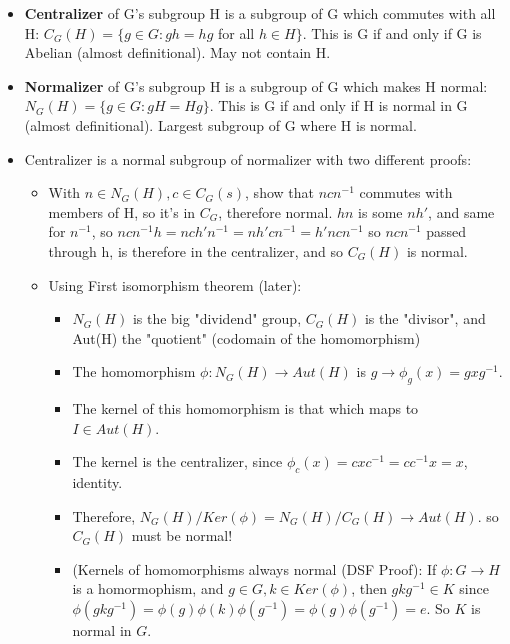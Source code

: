 \documentclass[11pt, oneside]{article}   	%
\begin{document}
\begin{itemize}
\item \textbf{Centralizer} of G's subgroup H is a subgroup of G which commutes with all H: $C_G(H) = \{g \in G: gh = hg$ for all $h \in H\}$.  This is G if and only if G is Abelian (almost definitional).  May not contain H.
\item \textbf{Normalizer} of G's subgroup H is a subgroup of G which makes H normal: $N_G(H) = \{g \in G: gH= Hg\}$.  This is G if and only if H is normal in G (almost definitional).  Largest subgroup of G where H is normal.
\item Centralizer is  a normal subgroup of normalizer with two different proofs:
\begin{itemize}
\item With $n \in N_G(H), c \in C_G(s)$, show that $ncn^{-1}$ commutes with members of H, so it's in $C_G$, therefore normal.  $hn$ is some $nh'$, and same for $n^{-1}$, so $ncn^{-1}h = nch'n^{-1} = nh'cn^{-1} = h'ncn^{-1}$ so $ncn^{-1}$ passed through h, is therefore in the centralizer, and so $C_G(H)$ is normal.
\item Using First isomorphism theorem (later): 
  \begin{itemize}
  \item $N_G(H)$ is the big "dividend" group, $C_G(H)$ is the "divisor", and Aut(H) the "quotient" (codomain of the homomorphism)
  \item The homomorphism $\phi: N_G(H) \rightarrow Aut(H)$ is $g \rightarrow \phi_g(x) = gxg^{-1}$.
  \item The kernel of this homomorphism is that which maps to $I \in Aut(H)$.
  \item The kernel is the centralizer, since $\phi_c(x) = cxc^{-1} = cc^{-1}x = x$, identity.
  \item Therefore, $N_G(H) / Ker(\phi) = N_G(H) / C_G(H) \rightarrow Aut(H).$ so $C_G(H)$ must be normal!
  \item (Kernels of homomorphisms always normal (DSF Proof): If $\phi: G \rightarrow H$ is a homormophism, and $g \in G, k \in Ker(\phi)$, then $gkg^{-1} \in K$ since $\phi(gkg^{-1}) = \phi(g)\phi(k)\phi(g^{-1}) = \phi(g)\phi(g^{-1}) = e$.  So $K$ is normal in $G$.
  \end{itemize}
\end{itemize}

\end{itemize}
\end{document}
